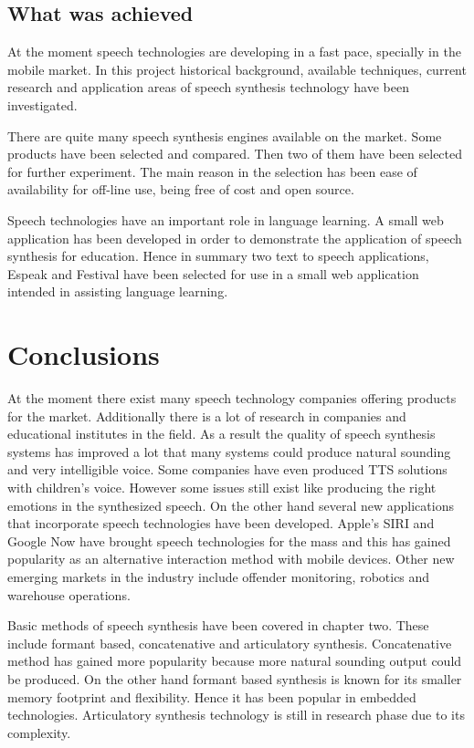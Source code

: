 \documentclass[11pt,a4paper,oneside,article]{memoir}
\begin{document}
\section{What was achieved }
At the moment speech technologies are developing in a fast pace, specially in the mobile market. In this project historical background, available techniques, current research and application areas of speech synthesis technology have been investigated.

There are quite many speech synthesis engines available on the market. Some products have been selected and compared. Then  two of them have been selected for further experiment. The main reason in the selection has been ease of availability for off-line use, being free of cost and open source. 

Speech technologies have an important role in language learning. A small web application has been developed in order to demonstrate the application of speech synthesis for education. Hence in summary two text to speech applications, Espeak and Festival have been selected for use in a small web application intended in assisting language learning.

\clearpage
\chapter{Conclusions}
At the moment there exist many speech technology companies offering products for the market. Additionally there is a lot of research in companies and educational institutes in the field. As a result the quality of speech synthesis systems has improved a lot that many systems could produce natural sounding and very intelligible voice. Some companies have even produced TTS solutions with children's voice. However some issues still exist like producing the right emotions in the synthesized speech. On the other hand several new applications that incorporate speech technologies have been developed. Apple's SIRI and Google Now have brought speech technologies for the mass and this has gained popularity as an alternative interaction method with mobile devices. Other new emerging markets in the industry include offender monitoring, robotics and warehouse operations.

Basic methods of speech synthesis have been covered in chapter two. These include formant based, concatenative and articulatory synthesis. Concatenative method has gained more popularity because more natural sounding output could be produced. On the other hand formant based synthesis is known for its smaller memory footprint and flexibility. Hence it has been popular in embedded technologies. Articulatory synthesis technology is still in research phase due to its complexity.
\end{document}
